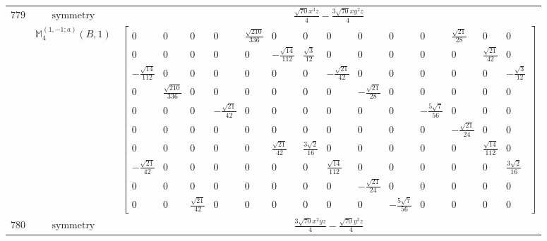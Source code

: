 \documentclass[fleqn,8pt,landscape]{jsarticle}
\begin{document}
\begin{longtable}{ccc}
$ 779 $ & $ \text{symmetry} $ & $ \frac{\sqrt{70} x^{3} z}{4} - \frac{3 \sqrt{70} x y^{2} z}{4} $ \\
$  $ & $ \mathbb{M}_{4}^{(1,-1;a)}(B,1) $ & $ \begin{bmatrix} 0 & 0 & 0 & 0 & \frac{\sqrt{210}}{336} & 0 & 0 & 0 & 0 & 0 & 0 & \frac{\sqrt{21}}{28} & 0 & 0 \\ 0 & 0 & 0 & 0 & 0 & - \frac{\sqrt{14}}{112} & \frac{\sqrt{3}}{12} & 0 & 0 & 0 & 0 & 0 & \frac{\sqrt{21}}{42} & 0 \\ - \frac{\sqrt{14}}{112} & 0 & 0 & 0 & 0 & 0 & 0 & - \frac{\sqrt{21}}{42} & 0 & 0 & 0 & 0 & 0 & - \frac{\sqrt{3}}{12} \\ 0 & \frac{\sqrt{210}}{336} & 0 & 0 & 0 & 0 & 0 & 0 & - \frac{\sqrt{21}}{28} & 0 & 0 & 0 & 0 & 0 \\ 0 & 0 & 0 & - \frac{\sqrt{21}}{42} & 0 & 0 & 0 & 0 & 0 & 0 & - \frac{5 \sqrt{7}}{56} & 0 & 0 & 0 \\ 0 & 0 & 0 & 0 & 0 & 0 & 0 & 0 & 0 & 0 & 0 & - \frac{\sqrt{21}}{24} & 0 & 0 \\ 0 & 0 & 0 & 0 & 0 & \frac{\sqrt{21}}{42} & \frac{3 \sqrt{2}}{16} & 0 & 0 & 0 & 0 & 0 & \frac{\sqrt{14}}{112} & 0 \\ - \frac{\sqrt{21}}{42} & 0 & 0 & 0 & 0 & 0 & 0 & \frac{\sqrt{14}}{112} & 0 & 0 & 0 & 0 & 0 & \frac{3 \sqrt{2}}{16} \\ 0 & 0 & 0 & 0 & 0 & 0 & 0 & 0 & - \frac{\sqrt{21}}{24} & 0 & 0 & 0 & 0 & 0 \\ 0 & 0 & \frac{\sqrt{21}}{42} & 0 & 0 & 0 & 0 & 0 & 0 & - \frac{5 \sqrt{7}}{56} & 0 & 0 & 0 & 0 \end{bmatrix} $ \\ \hline
$ 780 $ & $ \text{symmetry} $ & $ \frac{3 \sqrt{70} x^{2} y z}{4} - \frac{\sqrt{70} y^{3} z}{4} $ \\

\end{longtable}
\end{document}
